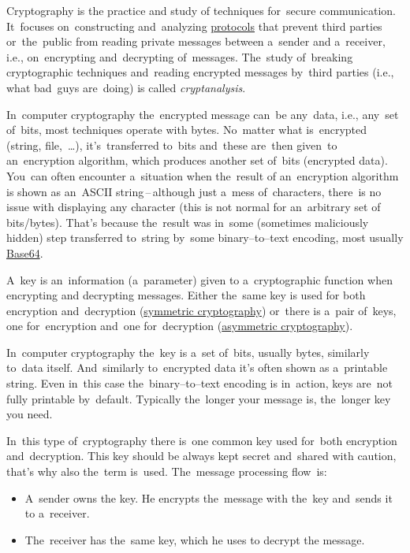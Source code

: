 \label{cryptography}
Cryptography is the practice and study of techniques for~secure communication.
It~focuses on~constructing and~analyzing \hyperref[protocolstandard]{protocols} that prevent third parties or~the~public from reading private messages between a~sender and a~receiver, i.e., on~encrypting and~decrypting of~messages.
The~study of~breaking cryptographic techniques and~reading encrypted messages by~third parties (i.e., what bad~guys are~doing) is called \textit{cryptanalysis}.

In~computer cryptography the~encrypted message can~be any~data, i.e., any~set of~bits, most techniques operate with bytes.
No~matter what is~encrypted (string, file,~\dots), it's~transferred to~bits and~these are~then given~to an~encryption algorithm, which produces another set of~bits (encrypted data).
You~can often encounter a~situation when the~result of an~encryption algorithm is shown as an~ASCII string\,--\,although just a~mess of~characters, there~is no issue with displaying any character (this is not normal for an~arbitrary set of bits/bytes).
That's because the~result was in~some (sometimes maliciously hidden) step transferred to~string by~some binary--to--text encoding, most usually \hyperref[base64]{Base64}.

A~key is an~information (a~parameter) given to a~cryptographic function when encrypting and decrypting messages.
Either the~same key is used for both encryption and~decryption (\hyperref[symmetriccryptography]{symmetric cryptography}) or~there is a~pair of~keys, one for~encryption and~one for~decryption (\hyperref[asymmetriccryptography]{asymmetric cryptography}).

In~computer cryptography the~key is a~set of~bits, usually bytes, similarly to~data itself.
And~similarly to~encrypted data it's often shown as a~printable string.
Even in~this case the~binary--to--text encoding is in~action, keys are~not fully printable by~default.
Typically the~longer your message is, the~longer key you need.

\label{symmetriccryptography}
In~this type of~cryptography there is~one common key used for~both encryption and~decryption.
This key should be always kept secret and~shared with caution, that's why also the~term  is~used.
The~message processing flow~is:
\begin{itemize}
    \item A~sender owns the key.
          He encrypts the~message with the~key and~sends it to a~receiver.
    \item The~receiver has the~same key, which he uses to decrypt the message.
\end{itemize}

